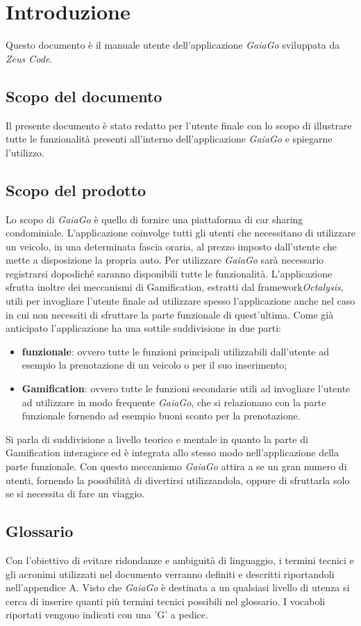 \section{Introduzione}
Questo documento è il manuale utente dell'applicazione \textit{GaiaGo} sviluppata da \textit{Zeus Code}.
\subsection{Scopo del documento}
Il presente documento è stato redatto per l’utente finale con lo scopo di illustrare tutte le funzionalità presenti all'interno dell'applicazione \textit{GaiaGo} e spiegarne l’utilizzo.

\subsection{Scopo del prodotto}
Lo scopo di \textit{GaiaGo} è quello di fornire una piattaforma di car sharing condominiale. L'applicazione coinvolge tutti gli utenti che necessitano di utilizzare un veicolo, in una determinata fascia oraria, al prezzo imposto dall'utente che mette a disposizione la propria auto. Per utilizzare \textit{GaiaGo} sarà necessario registrarsi dopodiché saranno disponibili tutte le funzionalità. L'applicazione sfrutta inoltre dei meccanismi di Gamification\glo, estratti dal framework\glosp \textit{Octalysis}\glo, utili per invogliare l'utente finale ad utilizzare spesso l'applicazione anche nel caso in cui non necessiti di sfruttare la parte funzionale di quest'ultima. Come già anticipato l'applicazione ha una sottile suddivisione in due parti:
\begin{itemize}
	\item \textbf{funzionale}: ovvero tutte le funzioni principali utilizzabili dall'utente ad esempio la prenotazione di un veicolo o per il suo inserimento; 
	\item \textbf{Gamification}: ovvero tutte le funzioni secondarie utili ad invogliare l'utente ad utilizzare in modo frequente \textit{GaiaGo}, che si relazionano con la parte funzionale fornendo ad esempio buoni sconto per la prenotazione.
\end{itemize}
 Si parla di suddivisione a livello teorico e mentale in quanto la parte di Gamification interagisce ed è integrata allo stesso modo nell'applicazione della parte funzionale.
 Con questo meccanismo \textit{GaiaGo} attira a se un gran numero di utenti, fornendo la possibilità di divertirsi utilizzandola, oppure di sfruttarla solo se si necessita di fare un viaggio.
\subsection{Glossario}
Con l'obiettivo di evitare ridondanze e ambiguità di linguaggio, i termini tecnici e gli acronimi
utilizzati nel documento verranno definiti e descritti riportandoli nell'appendice A.
Visto che \textit{GaiaGo} è destinata a un qualsiasi livello di utenza si cerca di inserire quanti più termini tecnici possibili nel glossario.
I vocaboli riportati vengono indicati con una 'G' a pedice.